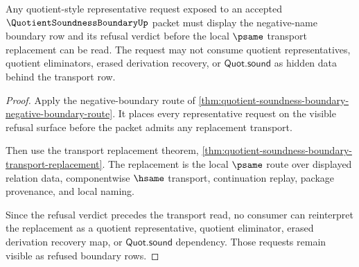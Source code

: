 \begin{theorem}
\label{thm:quotient-soundness-boundary-negative-route-visibility}
Any quotient-style representative request exposed to an accepted $\QuotientSoundnessBoundaryUp$ packet must display the negative-name boundary row and its refusal verdict before the local $\psame$ transport replacement can be read. The request may not consume quotient representatives, quotient eliminators, erased derivation recovery, or $\mathsf{Quot.sound}$ as hidden data behind the transport row.
\end{theorem}
\begin{proof}
Apply the negative-boundary route of \autoref{thm:quotient-soundness-boundary-negative-boundary-route}. It places every representative request on the visible refusal surface before the packet admits any replacement transport.

Then use the transport replacement theorem, \autoref{thm:quotient-soundness-boundary-transport-replacement}. The replacement is the local $\psame$ route over displayed relation data, componentwise $\hsame$ transport, continuation replay, package provenance, and local naming.

Since the refusal verdict precedes the transport read, no consumer can reinterpret the replacement as a quotient representative, quotient eliminator, erased derivation recovery map, or $\mathsf{Quot.sound}$ dependency. Those requests remain visible as refused boundary rows.
\end{proof}
